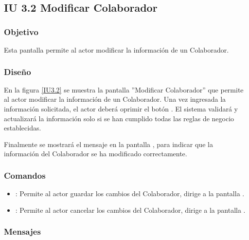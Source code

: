 \subsection{IU 3.2 Modificar Colaborador}

\subsubsection{Objetivo}
	Esta pantalla permite al actor modificar la información de un Colaborador.
\subsubsection{Diseño}
	En la figura \ref{IU3.2} se muestra la pantalla ''Modificar Colaborador'' que permite al actor modificar la información de un Colaborador.
	Una vez ingresada la información solicitada, el actor deberá oprimir el botón  . El sistema validará y actualizará la información solo si se han cumplido todas las reglas de negocio establecidas.
	
	Finalmente se mostrará el mensaje  en la pantalla , para indicar que la información del Colaborador se ha modificado correctamente.

\label{IU3.2}
\subsubsection{Comandos}
\begin{itemize}
	\item {}: Permite al actor guardar los cambios del Colaborador, dirige a la pantalla .
	\item {}: Permite al actor cancelar los cambios del Colaborador, dirige a la pantalla .
\end{itemize}

\subsubsection{Mensajes}

